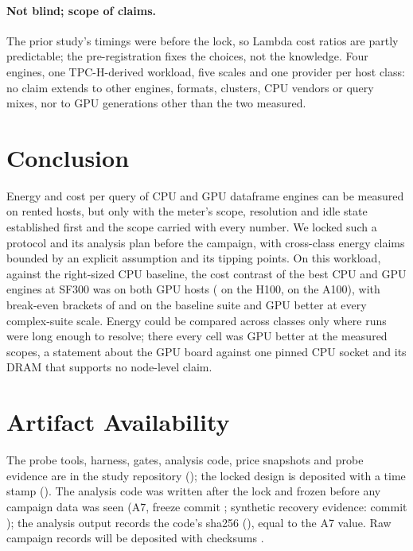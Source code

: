 \documentclass[sigconf]{acmart}
\begin{document}
\paragraph{Not blind; scope of claims.} The prior study's timings were  before the lock, so Lambda cost ratios are partly predictable; the pre-registration fixes the choices, not the knowledge. Four
engines, one TPC-H-derived workload, five scales and one provider per host class: no claim extends
to other engines, formats, clusters, CPU vendors or query mixes, nor to GPU generations other than the
two measured.

\section{Conclusion}
\label{sec:conclusion}
Energy and cost per query of CPU and GPU dataframe engines can be measured on rented hosts, but
only with the meter's scope, resolution and idle state established first and the scope carried
with every number. We locked such a protocol and its analysis plan before the campaign, with cross-class
energy claims bounded by an explicit assumption and its tipping points.
On this workload, against the right-sized CPU baseline, the cost contrast of the best CPU and GPU engines at
SF300 was  on both GPU hosts
( on the H100,  on the
A100), with break-even brackets of  and
 on the baseline suite and GPU better at every
complex-suite scale. Energy could be compared across classes only where runs were long enough to resolve;
there every cell was GPU better at the measured scopes, a statement about the GPU board against one
pinned CPU socket and its DRAM that supports no node-level claim.

\section*{Artifact Availability}
\label{sec:artifacts}
The probe tools, harness, gates, analysis code, price snapshots and probe evidence are in the
study repository (\repourl); the locked design is deposited with a time stamp (\lockdoi). The
analysis code was written after the lock and frozen before any campaign data was seen (A7, freeze
commit ; synthetic recovery evidence: commit
); the analysis output records the code's sha256
(), equal to the A7 value. Raw campaign records will be
deposited with checksums .
\end{document}
